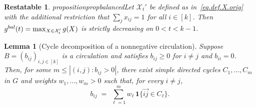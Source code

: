 \documentclass[10pt,a4paper]{amsart}
\newtheorem{restatable}{Restatable}
\newtheorem{lemma}{Lemma}
\begin{document}
\begin{restatable}
{proposition}{propbalanced}\label{prop.balanced}
Let $\mathcal{X}_t'$ be defined as in~\eqref{eq.def.X.orig} with the additional restriction that $\sum_j x_{ij} =1$ for all $i\in[k]$. Then $g^{\rm bal}(t)=\max_{X \in \mathcal{X}_t'}g(X)$ is {\em strictly} decreasing on $0<t<k-1$.
\end{restatable}

\begin{lemma}[Cycle decomposition of a nonnegative circulation]
\label{lem:cycle_decomposition}
Suppose $B=(b_{ij})_{i,j\in[k]}$ is a circulation and satisfies $b_{ij}\ge 0$ for $i\neq j$ and $b_{ii}=0$.
Then, for some $m \leq |(i,j) : b_{ij}>0|$,
 there exist \emph{simple directed cycles} 
$C_1,\dots,C_m$ in $G$ and weights $w_1,\dots,w_m>0$ such that, for every $i\neq j$,
\[
b_{ij} \;=\; \sum_{\ell=1}^m w_\ell \,\mathbf{1}\{ \vec{ij}\in C_\ell\}.
\]
\end{lemma}
\end{document}
